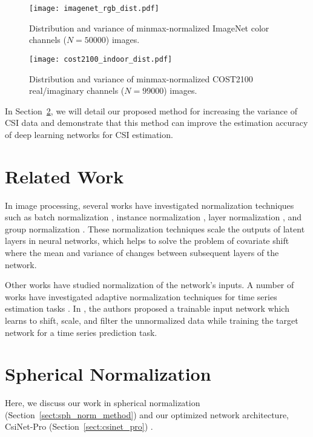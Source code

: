 \begin{figure}[htb]
	\centering
	\texttt{[image: imagenet\_rgb\_dist.pdf]}
	\medskip
	\caption{Distribution and variance of minmax-normalized ImageNet color channels ($N=50000$) images.}
	\label{fig:imagenet_dist}
\end{figure}

\begin{figure}[htb]
	\centering
	\texttt{[image: cost2100\_indoor\_dist.pdf]}
	\medskip
	\caption{Distribution and variance of minmax-normalized COST2100 real/imaginary channels ($N=99000$) images.}
	\label{fig:cost_indoor_dist}
\end{figure}

In Section~\ref{sect:sph_norm}, we  will detail our proposed method for increasing the variance of CSI data and demonstrate that this method can improve the estimation accuracy of deep learning networks for CSI estimation.

\section{Related Work}

In image processing, several works have investigated normalization techniques such as batch normalization \cite{ref:ioffe2015batch}, instance normalization \cite{ref:huang2017instance}, layer normalization \cite{ref:ba2016layer}, and group normalization \cite{ref:wu2018group}. These normalization techniques scale the outputs of latent layers in neural networks, which helps to solve the problem of covariate shift \cite{ref:ioffe2015batch} where the mean and variance of changes between subsequent layers of the network.

Other works have studied normalization of the network's inputs. A number of works have investigated adaptive normalization techniques for time series estimation tasks \cite{ref:ogasawara2010adaptive, ref:nayak2014impact, ref:shao2015self}. In \cite{ref:passalis2019dain}, the authors proposed a trainable input network which learns to shift, scale, and filter the unnormalized data while training the target network for a time series prediction task.

\section{Spherical Normalization} \label{sect:sph_norm}

Here, we discuss our work in spherical normalization (Section~\ref{sect:sph_norm_method}) and our optimized network architecture, CsiNet-Pro (Section~\ref{sect:csinet_pro}) \cite{ref:liu2020sphnet}.

